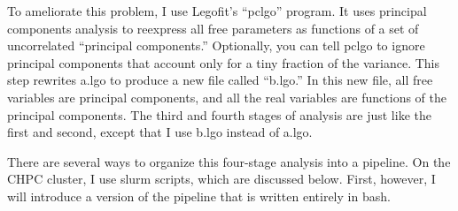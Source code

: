 \documentclass[11pt]{article}
\begin{document}
To ameliorate this problem, I use Legofit's ``pclgo'' program. It uses
principal components analysis to reexpress all free parameters as
functions of a set of uncorrelated ``principal components.''
Optionally, you can tell pclgo to ignore principal components that
account only for a tiny fraction of the variance. This step rewrites
a.lgo to produce a new file called ``b.lgo.'' In this new file, all
free variables are principal components, and all the real variables
are functions of the principal components.  The third and fourth
stages of analysis are just like the first and second, except that I
use b.lgo instead of a.lgo.

There are several ways to organize this four-stage analysis into a
pipeline. On the CHPC cluster, I use slurm scripts, which are
discussed below. First, however, I will introduce a version of the
pipeline that is written entirely in bash.
\end{document}
